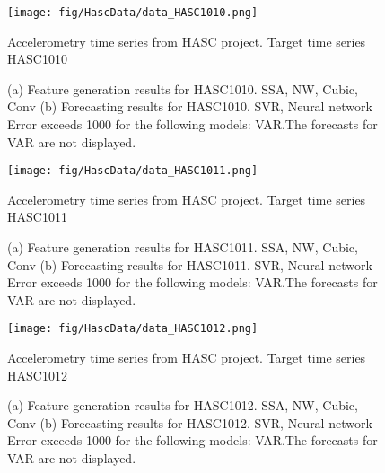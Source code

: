 \documentclass[12pt]{article}
\begin{document}
\begin{figure}
\centering
\texttt{[image: fig/HascData/data\_HASC1010.png]}
\caption{Accelerometry time series from HASC project. Target time series	HASC1010	}
\end{figure}


\begin{figure}
\centering
{}
\caption{(a)	Feature generation results for	HASC1010.	SSA, NW, Cubic, Conv	(b)	Forecasting results for	HASC1010.	SVR, Neural network	Error exceeds 1000 for the following models: VAR.The forecasts for VAR are not displayed.	}
\end{figure}


\begin{figure}
\centering
\texttt{[image: fig/HascData/data\_HASC1011.png]}
\caption{Accelerometry time series from HASC project. Target time series	HASC1011	}
\end{figure}


\begin{figure}
\centering
{}
\caption{(a)	Feature generation results for	HASC1011.	SSA, NW, Cubic, Conv	(b)	Forecasting results for	HASC1011.	SVR, Neural network	Error exceeds 1000 for the following models: VAR.The forecasts for VAR are not displayed.	}
\end{figure}


\begin{figure}
\centering
\texttt{[image: fig/HascData/data\_HASC1012.png]}
\caption{Accelerometry time series from HASC project. Target time series	HASC1012	}
\end{figure}


\begin{figure}
\centering
{}
\caption{(a)	Feature generation results for	HASC1012.	SSA, NW, Cubic, Conv	(b)	Forecasting results for	HASC1012.	SVR, Neural network	Error exceeds 1000 for the following models: VAR.The forecasts for VAR are not displayed.	}
\end{figure}
\end{document}
